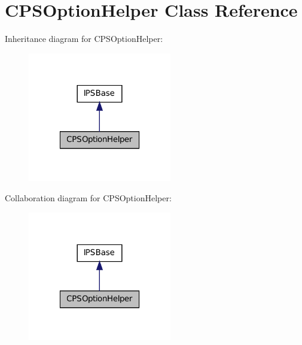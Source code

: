 \hypertarget{classCPSOptionHelper}{
\section{CPSOptionHelper Class Reference}
\label{classCPSOptionHelper}
}


Inheritance diagram for CPSOptionHelper:\nopagebreak
\begin{figure}[H]
\begin{center}
\leavevmode
\includegraphics[width=178pt]{classCPSOptionHelper__inherit__graph}
\end{center}
\end{figure}


Collaboration diagram for CPSOptionHelper:\nopagebreak
\begin{figure}[H]
\begin{center}
\leavevmode
\includegraphics[width=178pt]{classCPSOptionHelper__coll__graph}
\end{center}
\end{figure}
